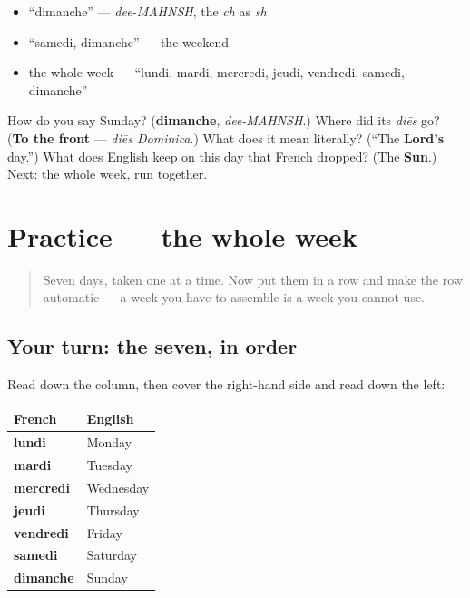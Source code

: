 \begin{itemize}
\raggedright
  \item \textquotedblleft{}dimanche\textquotedblright{} — \emph{dee-MAHNSH}, the \emph{ch} as \emph{sh}
  \item \textquotedblleft{}samedi, dimanche\textquotedblright{} — the weekend
  \item the whole week — \textquotedblleft{}lundi, mardi, mercredi, jeudi, vendredi, samedi, dimanche\textquotedblright{}
\end{itemize}

\begin{tcolorbox}[breakable,colback=teal!4,colframe=teal!35!black,title={Before you move on}]
How do you say Sunday? (\textbf{dimanche}, \emph{dee-MAHNSH}.) Where did its \emph{diēs} go? (\textbf{To the front} — \emph{diēs Dominica}.) What does it mean literally? (\textquotedblleft{}The \textbf{Lord's} day.\textquotedblright{}) What does English keep on this day that French dropped? (The \textbf{Sun}.) Next: the whole week, run together.
\end{tcolorbox}
\section[Practice]{Practice — the whole week}

\label{lesson:FR-C07-practice}



\begin{quote}
Seven days, taken one at a time. Now put them in a row and make the row automatic — a week you have to assemble is a week you cannot use.
\end{quote}

\subsection*{Your turn: the seven, in order}
Read down the column, then cover the right-hand side and read down the left:

\noindent
\begin{tabularx}{\linewidth}{@{}>{\raggedright\arraybackslash}X>{\raggedright\arraybackslash}X@{}}
\toprule
\textbf{French} & \textbf{English} \\
\midrule
\textbf{lundi} & Monday \\
\textbf{mardi} & Tuesday \\
\textbf{mercredi} & Wednesday \\
\textbf{jeudi} & Thursday \\
\textbf{vendredi} & Friday \\
\textbf{samedi} & Saturday \\
\textbf{dimanche} & Sunday \\
\bottomrule
\end{tabularx}

